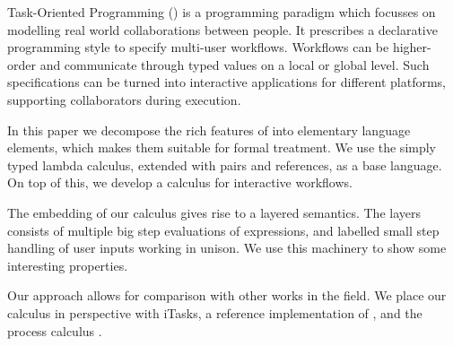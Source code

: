 
Task-Oriented Programming (\TOP) is a programming paradigm which focusses on modelling real world collaborations between people.
It prescribes a declarative programming style to specify multi-user workflows.
Workflows can be higher-order and communicate through typed values on a local or global level.
Such specifications can be turned into interactive applications for different platforms,
supporting collaborators during execution.

In this paper we decompose the rich features of \TOP into elementary language elements,
which makes them suitable for formal treatment.
We use the simply typed lambda calculus, extended with pairs and references, as a base language.
On top of this, we develop a calculus for interactive workflows.

The embedding of our calculus gives rise to a layered semantics.
The layers consists of multiple big step evaluations of expressions,
and labelled small step handling of user inputs working in unison.
We use this machinery to show some interesting properties.

Our approach allows for comparison with other works in the field.
We place our calculus in perspective with iTasks, a reference implementation of \TOP,
and the process calculus \CSP.
